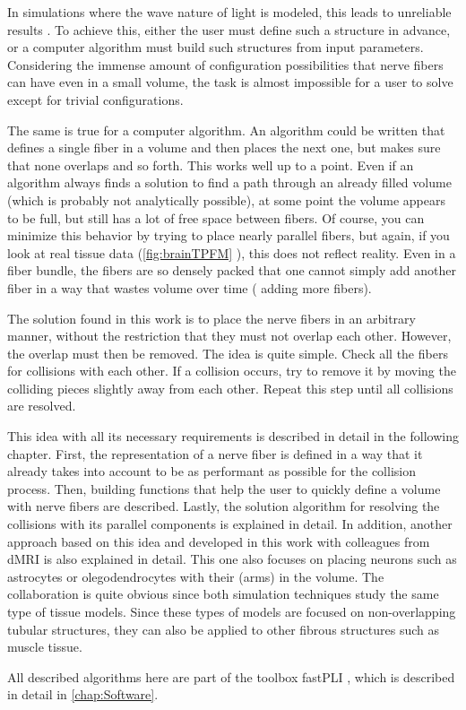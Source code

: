 In simulations where the wave nature of light is modeled, this leads to unreliable results \cite{MenzelDissertation}.
To achieve this, either the user must define such a structure in advance, or a computer algorithm must build such structures from input parameters.
Considering the immense amount of configuration possibilities that nerve fibers can have even in a small volume, the task is almost impossible for a user to solve except for trivial configurations.
\par
% 
The same is true for a computer algorithm.
An algorithm could be written that defines a single fiber in a volume and then places the next one, but makes sure that none overlaps and so forth.
This works well up to a point.
Even if an algorithm always finds a solution to find a path through an already filled volume (which is probably not analytically possible), at some point the volume appears to be full, but still has a lot of free space between fibers.
Of course, you can minimize this behavior by trying to place nearly parallel fibers, but again, if you look at real tissue data (\cref{fig:brainTPFM} \dummy{}), this does not reflect reality.
Even in a fiber bundle, the fibers are so densely packed that one cannot simply add another fiber in a way that wastes volume over time (\ie{} adding more fibers).
\par
% 
The solution found in this work is to place the nerve fibers in an arbitrary manner, without the restriction that they must not overlap each other.
However, the overlap must then be removed.
The idea is quite simple.
Check all the fibers for collisions with each other.
If a collision occurs, try to remove it by moving the colliding pieces slightly away from each other.
Repeat this step until all collisions are resolved.
\par
% 
This idea \cite{Matuschke2019} with all its necessary requirements is described in detail in the following chapter.
First, the representation of a nerve fiber is defined in a way that it already takes into account to be as performant as possible for the collision process.
Then, building functions that help the user to quickly define a volume with nerve fibers are described.
Lastly, the solution algorithm for resolving the collisions with its parallel components is explained in detail.
In addition, another approach based on this idea and developed in this work with colleagues from \ac{dMRI} is also explained in detail.
This one also focuses on placing neurons such as astrocytes or olegodendrocytes with their (arms) in the volume.
The collaboration is quite obvious since both simulation techniques study the same type of tissue models.
Since these types of models are focused on non-overlapping tubular structures, they can also be applied to other fibrous structures such as muscle tissue.
\par
% 
All described algorithms here are part of the toolbox \ac{fastPLI} \cite{Matuschke2021}, which is described in detail in \cref{chap:Software}.
% 
% 
% 
